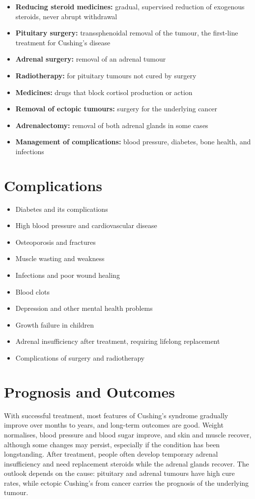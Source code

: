 \begin{itemize}
    \item \textbf{Reducing steroid medicines:} gradual, supervised reduction of exogenous steroids, never abrupt withdrawal
    \item \textbf{Pituitary surgery:} transsphenoidal removal of the tumour, the first-line treatment for Cushing's disease
    \item \textbf{Adrenal surgery:} removal of an adrenal tumour
    \item \textbf{Radiotherapy:} for pituitary tumours not cured by surgery
    \item \textbf{Medicines:} drugs that block cortisol production or action
    \item \textbf{Removal of ectopic tumours:} surgery for the underlying cancer
    \item \textbf{Adrenalectomy:} removal of both adrenal glands in some cases
    \item \textbf{Management of complications:} blood pressure, diabetes, bone health, and infections
\end{itemize}

\section*{Complications}
\begin{itemize}
    \item Diabetes and its complications
    \item High blood pressure and cardiovascular disease
    \item Osteoporosis and fractures
    \item Muscle wasting and weakness
    \item Infections and poor wound healing
    \item Blood clots
    \item Depression and other mental health problems
    \item Growth failure in children
    \item Adrenal insufficiency after treatment, requiring lifelong replacement
    \item Complications of surgery and radiotherapy
\end{itemize}

\section*{Prognosis and Outcomes}
With successful treatment, most features of Cushing's syndrome gradually improve over months to years, and long-term outcomes are good. Weight normalises, blood pressure and blood sugar improve, and skin and muscle recover, although some changes may persist, especially if the condition has been longstanding. After treatment, people often develop temporary adrenal insufficiency and need replacement steroids while the adrenal glands recover. The outlook depends on the cause: pituitary and adrenal tumours have high cure rates, while ectopic Cushing's from cancer carries the prognosis of the underlying tumour.

